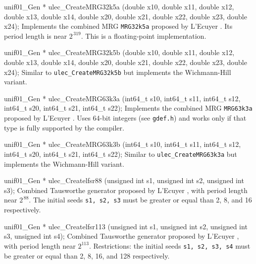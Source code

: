 unif01_Gen * ulec_CreateMRG32k5a (double x10, double x11, double x12,
                                  double x13, double x14, double x20,
                                  double x21, double x22, double x23,
                                  double x24);
\endcode
 \tab Implements the combined MRG {\tt MRG32k5a}
  proposed by L'Ecuyer \cite{rLEC99b}.
%
  Its period length is near $2^{\,319}$.
  This is a floating-point implementation.
 \endtab
\code


unif01_Gen * ulec_CreateMRG32k5b (double x10, double x11, double x12,
                                  double x13, double x14, double x20,
                                  double x21, double x22, double x23,
                                  double x24);
\endcode
 \tab  Similar to {\tt ulec\_CreateMRG32k5b} but implements
%
   the Wichmann-Hill variant.
 \endtab
\code


unif01_Gen * ulec_CreateMRG63k3a (int64_t s10, int64_t s11, int64_t s12,
                                  int64_t s20, int64_t s21, int64_t s22);
\endcode
 \tab Implements the combined MRG {\tt MRG63k3a}
  proposed by L'Ecuyer \cite{rLEC99b}.
%
  Uses 64-bit integers (see {\tt gdef.h})
  and works only if that type is fully supported by the compiler.
 \endtab
\code


unif01_Gen * ulec_CreateMRG63k3b (int64_t s10, int64_t s11, int64_t s12,
                                  int64_t s20, int64_t s21, int64_t s22);
\endcode
 \tab Similar to {\tt ulec\_CreateMRG63k3a}
%
   but implements the Wichmann-Hill variant.
 \endtab
\code


unif01_Gen * ulec_Createlfsr88 (unsigned int s1, unsigned int s2,
                                unsigned int s3);
\endcode
 \tab Combined Tausworthe generator proposed by L'Ecuyer \cite{rLEC96a},
   with period length near $2^{\,88}$. The initial seeds \texttt{s1, s2, s3}
   must be greater or equal than 2, 8, and 16 respectively.
%
 \endtab
\code


unif01_Gen * ulec_Createlfsr113 (unsigned int s1, unsigned int s2,
                                 unsigned int s3, unsigned int s4);
\endcode
 \tab Combined Tausworthe generator proposed by L'Ecuyer \cite{rLEC99a},
   with period length near $2^{113}$. Restrictions: the initial seeds
%
  \texttt{s1, s2, s3, s4}
   must be greater or equal than 2, 8, 16, and 128 respectively.
 \endtab
\code


